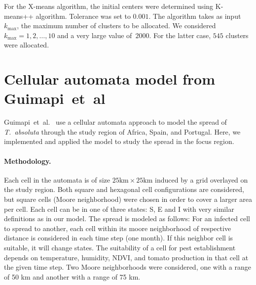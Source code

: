 \documentclass[10pt]{article}
\newcommand{\aacomment}[1]{({\color{magenta}AA: #1})}
\theoremstyle{definition}
\newcommand{\tuta}{\emph{T.~absoluta}}
\begin{document}
For the X-means algorithm, the initial centers were determined using
K-means++ algorithm. Tolerance was set to $0.001$. The algorithm takes as
input $k_\max$, the maximum number of clusters to be allocated. We
considered~$k_\max=1,2,\ldots,10$ and a very large value of~$2000$. For the
latter case, $545$ clusters were allocated.


\section{Cellular automata model from Guimapi~et~al}
\label{sec:guimapi}
Guimapi~et~al.~\cite{guimapi2016modeling} use a cellular automata approach
to model the spread of \tuta{} through the study region of Africa, Spain, and Portugal. 
Here, we implemented and applied the model to study the spread in the focus
region.
\paragraph{Methodology.}
Each cell in the automata is of size $25\mathrm{km}\times25\mathrm{km}$ induced by a
grid overlayed on the study region. Both square and hexagonal cell
configurations are considered, but square cells (Moore neighborhood) were
chosen in order to cover a larger area per cell.
Each cell can be in one of three states: S, E and I with very similar
definitions as in our model.
The spread is modeled as follows:
For an infected cell to spread to another, each cell within its moore
neighborhood of respective distance is considered in each time step (one month). If this neighbor cell is
suitable, it will change states. The suitability of a cell for pest
establishment depends on temperature, humidity, NDVI, and tomato production
in that cell at the given time step.
Two Moore neighborhoods were
considered, one with a range of 50 km and another with a range of 75 km.
\end{document}
